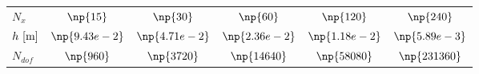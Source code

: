 

%   

\begin{tabular}{rrrrcrc}
\toprule

\multicolumn{2}{l}{$ N_x $}
  &  \multicolumn{1}{c}{$ \np{15} $}
  &  \multicolumn{1}{c}{$ \np{30} $}
  &  \multicolumn{1}{c}{$ \np{60} $}
  &  \multicolumn{1}{c}{$ \np{120} $}
  &  \multicolumn{1}{c}{$ \np{240} $}
  \\

\multicolumn{2}{l}{$ h~[\textup{m}] $}
  &  \multicolumn{1}{c}{$ \np{9.43e-2} $}
  &  \multicolumn{1}{c}{$ \np{4.71e-2} $}
  &  \multicolumn{1}{c}{$ \np{2.36e-2} $}
  &  \multicolumn{1}{c}{$ \np{1.18e-2} $}
  &  \multicolumn{1}{c}{$ \np{5.89e-3} $}
  \\

\multicolumn{2}{l}{$ N_{dof} $}
  &  \multicolumn{1}{c}{$ \np{960} $}
  &  \multicolumn{1}{c}{$ \np{3720} $}
  &  \multicolumn{1}{c}{$ \np{14640} $}
  &  \multicolumn{1}{c}{$ \np{58080} $}
  &  \multicolumn{1}{c}{$ \np{231360} $}
  \\

\midrule


\end{tabular}
